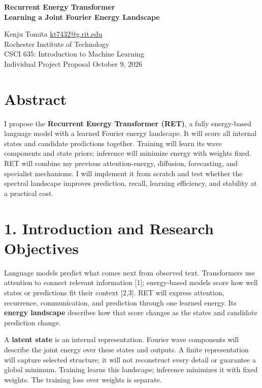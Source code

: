 \documentclass[11pt,letterpaper]{article}
\begin{document}
\begin{center}
{\Large\bfseries Recurrent Energy Transformer\\Learning a Joint Fourier Energy Landscape}\par
\vspace{3pt}
Kenju Tomita \quad \href{mailto:kt7432@g.rit.edu}{kt7432@g.rit.edu}\\
Rochester Institute of Technology\\
CSCI 635: Introduction to Machine Learning\\
Individual Project Proposal \quad October 9, 2026
\end{center}

\section*{Abstract}

I propose the \textbf{Recurrent Energy Transformer (RET)}, a fully energy-based language model with a learned Fourier energy landscape. It will score all internal states and candidate predictions together. Training will learn its wave components and state priors; inference will minimize energy with weights fixed. RET will combine my previous attention-energy, diffusion, forecasting, and specialist mechanisms. I will implement it from scratch and test whether the spectral landscape improves prediction, recall, learning efficiency, and stability at a practical cost.

\section*{1. Introduction and Research Objectives}

Language models predict what comes next from observed text. Transformers use attention to connect relevant information [1]; energy-based models score how well states or predictions fit their context [2,3]. RET will express attention, recurrence, communication, and prediction through one learned energy. Its \textbf{energy landscape} describes how that score changes as the states and candidate prediction change.

A \textbf{latent state} is an internal representation. Fourier wave components will describe the joint energy over these states and outputs. A finite representation will capture selected structure; it will not reconstruct every detail or guarantee a global minimum. Training learns this landscape; inference minimizes it with fixed weights. The training loss over weights is separate.
\end{document}
